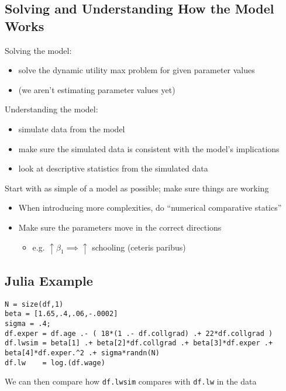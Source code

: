 \documentclass[11pt]{article}
\begin{document}
\subsection{Solving and Understanding How the Model Works}
\label{sec:orgd053b2c}

Solving the model:

\begin{itemize}
\item solve the dynamic utility max problem for given parameter values
\item (we aren't estimating parameter values yet)
\end{itemize}


Understanding the model:

\begin{itemize}
\item simulate data from the model
\item make sure the simulated data is consistent with the model's implications
\item look at descriptive statistics from the simulated data
\end{itemize}

Start with as simple of a model as possible; make sure things are working

\begin{itemize}
\item When introducing more complexities, do ``numerical comparative statics''
\item Make sure the parameters move in the correct directions
\begin{itemize}
\item e.g. \(\uparrow \beta_1 \implies \uparrow\) schooling (ceteris paribus)
\end{itemize}
\end{itemize}

\subsection{Julia Example}
\label{sec:org251da65}

\begin{verbatim}
N = size(df,1)
beta = [1.65,.4,.06,-.0002]
sigma = .4;
df.exper = df.age .- ( 18*(1 .- df.collgrad) .+ 22*df.collgrad )
df.lwsim = beta[1] .+ beta[2]*df.collgrad .+ beta[3]*df.exper .+ beta[4]*df.exper.^2 .+ sigma*randn(N)
df.lw    = log.(df.wage)
\end{verbatim}


We can then compare how \texttt{df.lwsim} compares with \texttt{df.lw} in the data
\end{document}
